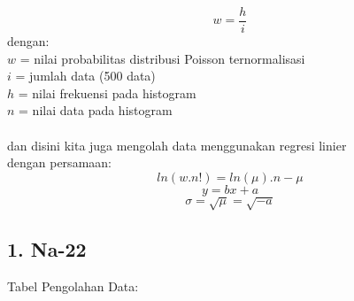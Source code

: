 \documentclass{article}
\begin{document}
		\begin{equation}
		w = \frac{h}{i}
		\end{equation}
		dengan:\\
		$w$ = nilai probabilitas distribusi Poisson ternormalisasi\\
		$i$ = jumlah data (500 data)\\
		$h$ = nilai frekuensi pada histogram\\
		$n$ = nilai data pada histogram\\ \\
		dan disini kita juga mengolah data menggunakan regresi linier\\
		dengan persamaan:
		\begin{equation}
		ln(w.n!) = ln(\mu).n-\mu
		\end{equation}
		\begin{equation}
		y = bx+a
		\end{equation}
		\begin{equation}
		\sigma = \sqrt{\mu} = \sqrt{-a}
		\end{equation}
			
			\subsection*{1. Na-22}
			Tabel Pengolahan Data:
			
\end{document}
